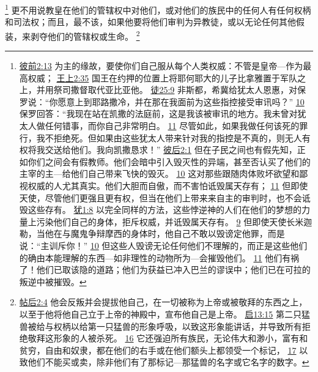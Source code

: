 \documentclass[12pt, a4paper, oneside]{ctexart}
\begin{document}
	\footnote {
		\href{https://biblehub.com/1_peter/2-13.htm}{彼前2:13} 为主的缘故，要使你们自己服从每个人类权威：不管是皇帝---作为最高权威；
		\href{https://biblehub.com/1_kings/2-35.htm}{王上2:35} 国王在约押的位置上将耶何耶大的儿子比拿雅置于军队之上，并用祭司撒督取代亚比亚他。
		\href{https://biblehub.com/acts/25-9.htm}{徒25:9} 非斯都，希冀给犹太人恩惠，对保罗说：“你愿意上到耶路撒冷，并在那在我面前为这些指控接受审讯吗？”
		\href{https://biblehub.com/acts/25-10.htm}{10} 保罗回答：“我现在站在凯撒的法庭前，这是我该被审讯的地方。我未曾对犹太人做任何错事，而你自己非常明白。
		\href{https://biblehub.com/acts/25-11.htm}{11} 尽管如此，如果我做任何该死的罪行，我不拒绝死。但如果由这些犹太人带来针对我的指控是不真的，则无人有权将我交送给他们。我向凯撒恳求！”
		\href{https://biblehub.com/2_peter/2-1.htm}{彼后2:1} 但在子民之间也有假先知，正如你们之间会有假教师。他们会暗中引入毁灭性的异端，甚至否认买了他们的主宰的主---给他们自己带来飞快的毁灭。
		\href{https://biblehub.com/2_peter/2-10.htm}{10} 这对那些跟随肉体败坏欲望和鄙视权威的人尤其真实。他们大胆而自傲，而不害怕诋毁属天存有；
		\href{https://biblehub.com/2_peter/2-11.htm}{11} 但即使天使，尽管他们更强且更有权，但当在他们上带来来自主的审判时，也不会诋毁这些存有。
		\href{https://biblehub.com/jude/1-8.htm}{犹1:8} 以完全同样的方法，这些悖逆神的人们在他们的梦想的力量上污染他们自己的身体，拒斥权威，并诋毁属天存有。
		\href{https://biblehub.com/jude/1-9.htm}{9} 但即使天使长米迦勒，当他在与魔鬼争辩摩西的身体时，他自己不敢以毁谤定他罪，而是说：“主训斥你！”
		\href{https://biblehub.com/jude/1-10.htm}{10} 但这些人毁谤无论任何他们不理解的，而正是这些他们的确由本能理解的东西---如非理性的动物所为---会摧毁他们。
		\href{https://biblehub.com/jude/1-11.htm}{11} 他们有祸了！他们已取该隐的道路；他们为获益已冲入巴兰的谬误中；他们已在可拉的叛逆中被摧毁。
	}
	更不用说教皇在他们的管辖权中对他们，或对他们的族民中的任何人有任何权柄和司法权；而且，最不该，如果他要将他们审判为异教徒，或以无论任何其他假装，来剥夺他们的管辖权或生命。
	\footnote {
		\href{https://biblehub.com/2_thessalonians/2-4.htm}{帖后2:4} 他会反叛并会提拔他自己，在一切被称为上帝或被敬拜的东西之上，以至于他将他自己立于上帝的神殿中，宣布他自己是上帝。
		\href{https://biblehub.com/revelation/13-15.htm}{启13:15} 第二只猛兽被给与权柄以给第一只猛兽的形象呼吸，以致这形象能讲话，并导致所有拒绝敬拜这形象的人被杀死。
		\href{https://biblehub.com/revelation/13-16.htm}{16} 它还强迫所有族民，无论伟大和渺小，富有和贫穷，自由和奴隶，都在他们的右手或在他们额头上都领受一个标记，
		\href{https://biblehub.com/revelation/13-17.htm}{17} 以致他们不能买或卖，除非他们有了那标记---那猛兽的名字或它名字的数字。
	}
\end{document}
